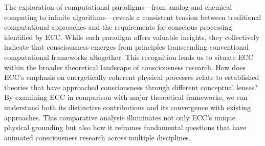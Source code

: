 The exploration of computational paradigms—from analog and chemical computing to infinite algorithms—reveals a consistent tension between traditional computational approaches and the requirements for conscious processing identified by ECC. While each paradigm offers valuable insights, they collectively indicate that consciousness emerges from principles transcending conventional computational frameworks altogether. This recognition leads us to situate ECC within the broader theoretical landscape of consciousness research. How does ECC's emphasis on energetically coherent physical processes relate to established theories that have approached consciousness through different conceptual lenses? By examining ECC in comparison with major theoretical frameworks, we can understand both its distinctive contributions and its convergence with existing approaches. This comparative analysis illuminates not only ECC's unique physical grounding but also how it reframes fundamental questions that have animated consciousness research across multiple disciplines.
